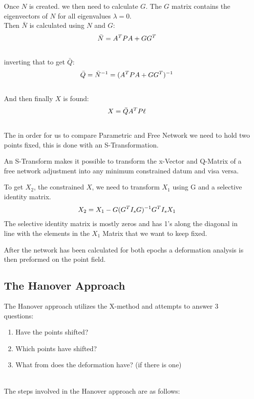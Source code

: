 \documentclass[12pt,a4paper]{article}
\begin{document}
			Once $N$ is created. we then need to calculate $G$. The $G$ matrix contains the eigenvectors of $N$ for all eigenvalues $\lambda = 0$.
			\\
			Then $\bar{N}$ is calculated using $N$ and $G$:
			\begin{equation}
			\notag
			\bar{N} = A^TPA + GG^T
			\end{equation}
			\\
			inverting that to get $\bar{Q}$:
			\begin{equation}
			\notag
			\bar{Q} = \bar{N}^{-1} = (A^TPA + GG^T)^{-1}
			\end{equation}
			\\
			And then finally $X$ is found:
			\begin{equation}
			\notag
			X = \bar{Q} A^TP\ell	
			\end{equation}
			\\
			The in order for us to compare Parametric and Free Network we need to hold two points fixed, this is done with an S-Transformation.
			
			An S-Transform makes it possible to transform the x-Vector and Q-Matrix of a free network adjustment into any minimum constrained datum and visa versa.
			
			To get $X_2$, the constrained $X$, we need to transform $X_1$ using G and a selective identity matrix.
			\begin{equation}
			\notag
			X_2 = X_1 - G(G^TI_sG)^{-1} G^T I_s X_1
			\end{equation}
			The selective identity matrix is mostly zeros and has 1's along the diagonal in line with the elements in the $X_1$ Matrix that we want to keep fixed.
			
			After the network has been calculated for both epochs a deformation analysis is then preformed on the point field.
	
		\subsection{The Hanover Approach}
			The Hanover approach utilizes the X-method and attempts to answer 3 questions:
			\begin{enumerate}
				\item Have the points shifted?
				\item Which points have shifted?
				\item What from does the deformation have? (if there is one)
			\end{enumerate}
		~\\
		The steps involved in the Hanover approach are as follows:
		
\end{document}
